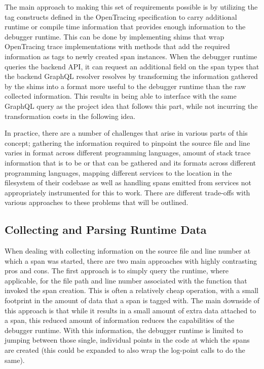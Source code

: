 \documentclass[12pt,pdftex,titlepage]{report}
\begin{document}
                The main approach to making this set of requirements possible is by utilizing the tag constructs defined in the OpenTracing specification to carry additional runtime or
                compile time information that provides enough information to the debugger runtime. This can be done by implementing shims that wrap OpenTracing trace implementations with
                methods that add the required information as tags to newly created span instances. When the debugger runtime queries the backend API, it can request an additional field on
                the span types that the backend GraphQL resolver resolves by transforming the information gathered by the shims into a format more useful to the debugger runtime than the
                raw collected information. This results in being able to interface with the same GraphQL query as the project idea that follows this part, while not incurring the 
                transformation costs in the following idea.

                In practice, there are a number of challenges that arise in various parts of this concept; gathering the information required to pinpoint the source file and line varies 
                in format across different programming languages, amount of stack trace information that is to be or that can be gathered and its formats across different programming 
                languages, mapping different services to the location in the filesystem of their codebase as well as handling spans emitted from services not appropriately instrumented 
                for this to work. There are different trade-offs with various approaches to these problems that will be outlined.

            \subsection{Collecting and Parsing Runtime Data}
            \label{sec:collecting}
                When dealing with collecting information on the source file and line number at which a span was started, there are two main approaches with highly contrasting pros and cons.
                The first approach is to simply query the runtime, where applicable, for the file path and line number associated with the function that invoked the span creation. This is often
                a relatively cheap operation, with a small footprint in the amount of data that a span is tagged with. The main downside of this approach is that while it results in a small 
                amount of extra data attached to a span, this reduced amount of information reduces the capabilities of the debugger runtime. With this information, the debugger runtime is
                limited to jumping between those single, individual points in the code at which the spans are created (this could be expanded to also wrap the log-point calls to do the same).
                
\end{document}
